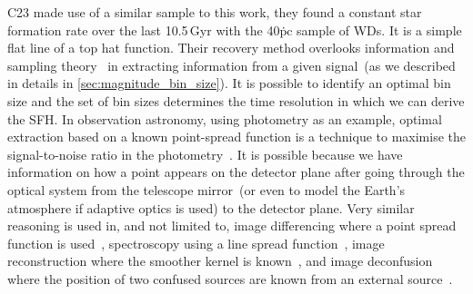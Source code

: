 \documentclass[fleqn,usenatbib]{mnras}
\begin{document}


C23 made use of a similar sample to this work, they found a constant star 
formation rate over the last 10.5\,Gyr 
with the 40\.pc sample of WDs. It is a simple flat line of a top hat function. 
Their recovery method overlooks information and sampling 
theory~\citep{1949IEEEP..37...10S} in extracting information from a given
signal~(as we described in details in \ref{sec:magnitude_bin_size}). It is 
possible to identify an optimal bin size and the set of bin sizes determines
the time resolution in which we can derive the SFH. In observation astronomy,
using photometry as an example, optimal extraction based on a known
point-spread function is a technique to maximise the signal-to-noise ratio in
the photometry~\citep{1980SPIE..264..171T, 1987PASP...99..191S}. It is possible
because we have information on how a point appears on the detector plane after 
going through the optical system from the telescope mirror~(or even to model
the Earth's atmosphere if adaptive optics is used) to the detector plane. Very 
similar reasoning is used in, and not limited to, image differencing where a
point spread function is used~\citep{1998ApJ...503..325A, 2008MNRAS.386L..77B, 
2009MNRAS.397.2099A, 2016ApJ...830...27Z}, spectroscopy using a line spread
function~\citep{1986PASP...98..609H, 1989PASP..101.1032M, 2003PASP..115..688K},
image reconstruction where the smoother kernel is
known~\citep{1972JOSA...62...55R, 1974AJ.....79..745L}, and image
deconfusion where the position of two confused sources are known from an
external source~\citep{2015A&A...582A..15M}.
\end{document}
